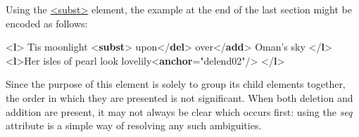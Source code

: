  Using the \hyperref[TEI.subst]{<subst>} element, the example at the end of the last section might be encoded as follows: \par\bgroup{}\exampleFont \begin{shaded}\noindent\mbox{}{<\textbf{l}>}\mbox{}\newline 
{} Tis moonlight\mbox{}\newline 
{<\textbf{subst}>}\mbox{}\newline 
\hspace*{1em}upon{</\textbf{del}>}\mbox{}\newline 
\hspace*{1em}over{</\textbf{add}>}\mbox{}\newline 
{} Oman's sky\mbox{}\newline 
{</\textbf{l}>}\mbox{}\newline 
{<\textbf{l}>}Her isles of pearl look lovelily{<\textbf{anchor}\hspace*{1em}{xml:id}="{delend02}"/>}\mbox{}\newline 
{</\textbf{l}>}\end{shaded}\egroup\par \noindent  Since the purpose of this element is solely to group its child elements together, the order in which they are presented is not significant. When both deletion and addition are present, it may not always be clear which occurs first: using the {\itshape seq} attribute is a simple way of resolving any such ambiguities.\par
